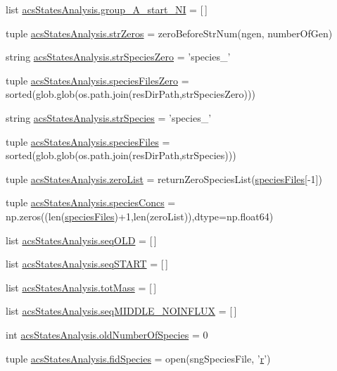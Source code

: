 \begin{DoxyCompactItemize}
list \hyperlink{a00130_aedb746884c5ae6e301c8ad2d8307fe4d}{acs\-States\-Analysis.\-group\-\_\-\-A\-\_\-start\-\_\-\-N\-I} = \mbox{[}$\,$\mbox{]}
\item 
tuple \hyperlink{a00130_a292c23aa303304f24632662a5dfbfa23}{acs\-States\-Analysis.\-str\-Zeros} = zero\-Before\-Str\-Num(ngen, number\-Of\-Gen)
\item 
string \hyperlink{a00130_a52f7239b2be2cb978182547960b6c46e}{acs\-States\-Analysis.\-str\-Species\-Zero} = 'species\-\_\-'
\item 
tuple \hyperlink{a00130_a5584994da277e7798c904342dff18427}{acs\-States\-Analysis.\-species\-Files\-Zero} = sorted(glob.\-glob(os.\-path.\-join(res\-Dir\-Path,str\-Species\-Zero)))
\item 
string \hyperlink{a00130_ab14d209fe558e83aeede3b657a7241bb}{acs\-States\-Analysis.\-str\-Species} = 'species\-\_\-'
\item 
tuple \hyperlink{a00130_af3291bd263282353dd4a12ee38c08cae}{acs\-States\-Analysis.\-species\-Files} = sorted(glob.\-glob(os.\-path.\-join(res\-Dir\-Path,str\-Species)))
\item 
tuple \hyperlink{a00130_ac2f9e6ead14745bd749a1ab8060cd4e7}{acs\-States\-Analysis.\-zero\-List} = return\-Zero\-Species\-List(\hyperlink{a00028_af5703745c2c2a6af7f62da460994d9c2}{species\-Files}\mbox{[}-\/1\mbox{]})
\item 
tuple \hyperlink{a00130_a2377568425051a7511b51f7c50662ba1}{acs\-States\-Analysis.\-species\-Concs} = np.\-zeros((len(\hyperlink{a00028_af5703745c2c2a6af7f62da460994d9c2}{species\-Files})+1,len(zero\-List)),dtype=np.\-float64)
\item 
list \hyperlink{a00130_a55e3b17fd716a4b1e28e7b9d93f1943c}{acs\-States\-Analysis.\-seq\-O\-L\-D} = \mbox{[}$\,$\mbox{]}
\item 
list \hyperlink{a00130_a648282264cfc8a40cf84141f9f59781f}{acs\-States\-Analysis.\-seq\-S\-T\-A\-R\-T} = \mbox{[}$\,$\mbox{]}
\item 
list \hyperlink{a00130_ac2ecae6789d89cc56b0a731065837774}{acs\-States\-Analysis.\-tot\-Mass} = \mbox{[}$\,$\mbox{]}
\item 
list \hyperlink{a00130_a8fd1a0445b2e641363a96da5a7e7159b}{acs\-States\-Analysis.\-seq\-M\-I\-D\-D\-L\-E\-\_\-\-N\-O\-I\-N\-F\-L\-U\-X} = \mbox{[}$\,$\mbox{]}
\item 
int \hyperlink{a00130_abe1ce9bb85ee916d2046efc5c3fe6b30}{acs\-States\-Analysis.\-old\-Number\-Of\-Species} = 0
\item 
tuple \hyperlink{a00130_afd34aa2ef2c410c2d71007bac0a121fd}{acs\-States\-Analysis.\-fid\-Species} = open(sng\-Species\-File, '\hyperlink{a00031_ac862e7284527eb913b1351c8bfb8e079}{r}')

\end{DoxyCompactItemize}
